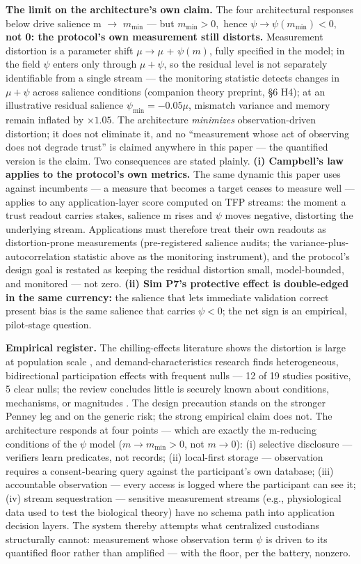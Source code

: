 \documentclass[
]{article}
\begin{document}
\textbf{The limit on the architecture's own claim.} The four
architectural responses below drive salience m \(\to\)
\(m_{\mathrm{min}}\) --- but \(m_{\mathrm{min}} > 0,\) hence
\textbf{\(\psi \to \psi (m_{\mathrm{min}}) < 0,\) not 0: the protocol's
own measurement still distorts.} Measurement distortion is a parameter
shift \(\mu \to \mu\) + \(\psi (m)\), fully specified in the model; in
the field \(\psi\) enters only through \(\mu+\psi\), so the residual
level is not separately identifiable from a single stream --- the
monitoring statistic detects changes in \(\mu+\psi\) across salience
conditions (companion theory preprint, §6 H4); at an illustrative
residual salience \(\psi_{\mathrm{min}} = -0.05\mu\), mismatch variance
and memory remain inflated by \(\times 1.05\). The architecture
\emph{minimizes} observation-driven distortion; it does not eliminate
it, and no ``measurement whose act of observing does not degrade trust''
is claimed anywhere in this paper --- the quantified version is the
claim. Two consequences are stated plainly. \textbf{(i) Campbell's law
applies to the protocol's own metrics.} The same dynamic this paper uses
against incumbents --- a measure that becomes a target ceases to measure
well --- applies to any application-layer score computed on TFP streams:
the moment a trust readout carries stakes, salience m rises and \(\psi\)
moves negative, distorting the underlying stream. Applications must
therefore treat their own readouts as distortion-prone measurements
(pre-registered salience audits; the variance-plus-autocorrelation
statistic above as the monitoring instrument), and the protocol's design
goal is restated as keeping the residual distortion small,
model-bounded, and monitored --- not zero. \textbf{(ii) Sim P7's
protective effect is double-edged in the same currency:} the salience
that lets immediate validation correct present bias is the same salience
that carries \(\psi < 0\); the net sign is an empirical, pilot-stage
question.

\textbf{Empirical register.} The chilling-effects literature shows the
distortion is large at population scale , and demand-characteristics
research finds heterogeneous, bidirectional participation effects with
frequent nulls --- 12 of 19 studies positive, 5 clear nulls; the review
concludes little is securely known about conditions, mechanisms, or
magnitudes . The design precaution stands on the stronger Penney leg and
on the generic risk; the strong empirical claim does not. The
architecture responds at four points --- which are exactly the
m-reducing conditions of the \(\psi\) model (\(m \to m_{\min} > 0\), not
\(m \to 0\)): (i) selective disclosure --- verifiers learn predicates,
not records; (ii) local-first storage --- observation requires a
consent-bearing query against the participant's own database; (iii)
accountable observation --- every access is logged where the participant
can see it; (iv) stream sequestration --- sensitive measurement streams
(e.g., physiological data used to test the biological theory) have no
schema path into application decision layers. The system thereby
attempts what centralized custodians structurally cannot: measurement
whose observation term \(\psi\) is driven to its quantified floor rather
than amplified --- with the floor, per the battery, nonzero.
\end{document}

